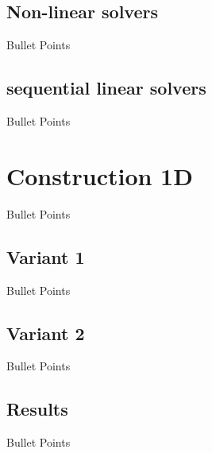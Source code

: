 \documentclass[aspectratio=169]{beamer}
\begin{document}
\subsection{Non-linear solvers}
\begin{frame}{Bullet Points}

\end{frame}
\subsection{sequential linear solvers}
\begin{frame}{Bullet Points}

\end{frame}



\section{Construction 1D}
\begin{frame}{Bullet Points}

\end{frame}


\subsection{Variant 1}
\begin{frame}{Bullet Points}

\end{frame}
\subsection{Variant 2}
\begin{frame}{Bullet Points}

\end{frame}
\subsection{Results}
\begin{frame}{Bullet Points}

\end{frame}
\end{document}
